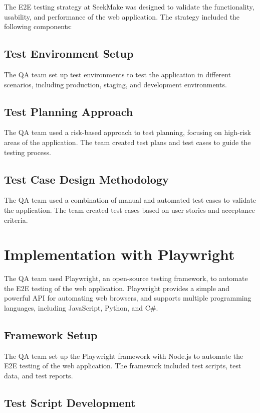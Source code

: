 The E2E testing strategy at SeekMake was designed to validate the functionality, usability, and performance of the web application. The strategy included the following components:

\subsection{Test Environment Setup}

The QA team set up test environments to test the application in different scenarios, including production, staging, and development environments.

\subsection{Test Planning Approach}

The QA team used a risk-based approach to test planning, focusing on high-risk areas of the application. The team created test plans and test cases to guide the testing process.

\subsection{Test Case Design Methodology}

The QA team used a combination of manual and automated test cases to validate the application. The team created test cases based on user stories and acceptance criteria.

\section{Implementation with Playwright}

The QA team used Playwright, an open-source testing framework, to automate the E2E testing of the web application. Playwright provides a simple and powerful API for automating web browsers, and supports multiple programming languages, including JavaScript, Python, and C\#.

\subsection{Framework Setup}

The QA team set up the Playwright framework with Node.js to automate the E2E testing of the web application. The framework included test scripts, test data, and test reports.

\subsection{Test Script Development}


